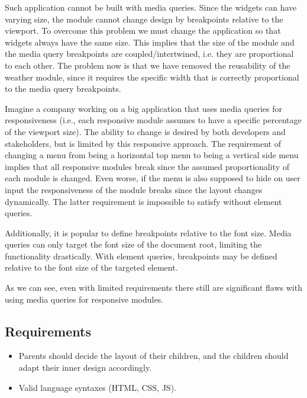 \documentclass{acm_proc_article-sp}
\begin{document}
    Such application cannot be built with media queries.
    Since the widgets can have varying size, the module cannot change design by breakpoints relative to the viewport.
    To overcome this problem we must change the application so that widgets always have the same size.
    This implies that the size of the module and the media query breakpoints are coupled/intertwined, i.e. they are proportional to each other.
    The problem now is that we have removed the reusability of the weather module, since it requires the specific width that is correctly proportional to the media query breakpoints. 

    Imagine a company working on a big application that uses media queries for responsiveness (i.e., each responsive module assumes to have a specific percentage of the viewport size).
    The ability to change is desired by both developers and stakeholders, but is limited by this responsive approach.
    The requirement of changing a menu from being a horizontal top menu to being a vertical side menu implies that all responsive modules break since the assumed proportionality of each module is changed.
    Even worse, if the menu is also supposed to hide on user input the responsiveness of the module breaks since the layout changes dynamically.
    The latter requirement is impossible to satisfy without element queries.

    Additionally, it is popular to define breakpoints relative to the font size.
    Media queries can only target the font size of the document root, limiting the functionality drastically.
    With element queries, breakpoints may be defined relative to the font size of the targeted element.

    As we can see, even with limited requirements there still are significant flaws with using media queries for responsive modules.

    \label{sec:reqs}
    \subsection{Requirements}
      \begin{itemize}
        \item Parents should decide the layout of their children, and the children should adapt their inner design accordingly.
        \item Valid language syntaxes (HTML, CSS, JS).
      \end{itemize}
\end{document}
